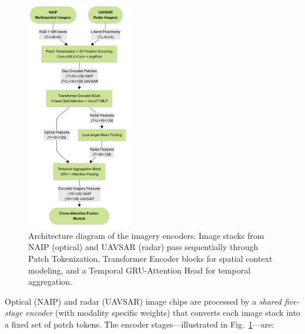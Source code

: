 \documentclass[preprint,12pt,authoryear]{elsarticle}
\begin{document}
\begin{figure}
  \centering
  \includegraphics[width=0.40\textwidth]{manuscript/figures/Imagery_Encoders.png}
  \caption{Architecture diagram of the imagery encoders. Image stacks from NAIP (optical) and UAVSAR (radar) pass sequentially through Patch Tokenization, Transformer Encoder blocks for spatial context modeling, and a Temporal GRU-Attention Head for temporal aggregation.}
  \label{fig:imgenc}
\end{figure}%

Optical (NAIP) and radar (UAVSAR) image chips are processed by a \emph{shared five-stage encoder} (with modality specific weights) that converts each image stack into a fixed set of patch tokens. The encoder stages—illustrated in Fig.~\ref{fig:imgenc}—are:
\end{document}
